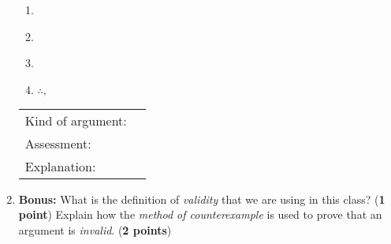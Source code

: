 \documentclass[10pt]{article}
\begin{document}
\begin{enumerate}
  \begin{enumerate}[1.]
    \item \underline{\hspace{6in}}
    \item \underline{\hspace{6in}}
    \item \underline{\hspace{6in}}
    \item \underline{$\therefore,$\hspace{5.9in}}
  \end{enumerate}
  
  \begin{tabular}{ll}
    Kind of argument: & \underline{\hspace{1.5in}} \\
    Assessment: & \underline{\hspace{1.5in}} \\
    Explanation: & \\
  \end{tabular}
  
\vspace{1in}  
  
  \item \textbf{Bonus:} What is the definition of \textit{validity} that we are using in this class? (\textbf{1 point}) Explain how the \textit{method of counterexample} is used to prove that an argument is \textit{invalid}. (\textbf{2 points})

\end{enumerate}
\end{document}
